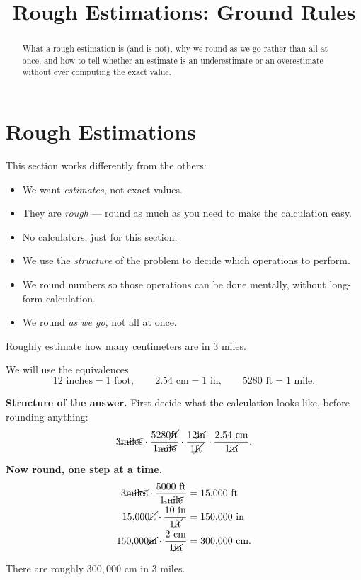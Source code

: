 \documentclass[12pt]{ximera}
\title{Rough Estimations: Ground Rules}
\begin{document}
\begin{abstract}
What a rough estimation is (and is not), why we round as we go rather than all at
once, and how to tell whether an estimate is an underestimate or an overestimate
without ever computing the exact value.
\end{abstract}
\maketitle

\section*{Rough Estimations}

This section works differently from the others:

\begin{itemize}
  \item We want \emph{estimates}, not exact values.
  \item They are \emph{rough} --- round as much as you need to make the calculation easy.
  \item No calculators, just for this section.
  \item We use the \emph{structure} of the problem to decide which operations to perform.
  \item We round numbers so those operations can be done mentally, without long-form
    calculation.
  \item We round \emph{as we go}, not all at once.
\end{itemize}

\begin{example}
Roughly estimate how many centimeters are in $3$ miles.

We will use the equivalences
\[
12 \text{ inches} = 1 \text{ foot}, \qquad
2.54 \text{ cm} = 1 \text{ in}, \qquad
5280 \text{ ft} = 1 \text{ mile}.
\]

\textbf{Structure of the answer.} First decide what the calculation looks like, before
rounding anything:
\[
3 \cancel{\text{miles}} \cdot \frac{5280 \cancel{\text{ft}}}{1 \cancel{\text{mile}}}
\cdot \frac{12 \cancel{\text{in}}}{1 \cancel{\text{ft}}}
\cdot \frac{2.54 \text{ cm}}{1 \cancel{\text{in}}}.
\]

\textbf{Now round, one step at a time.}
\[
\begin{aligned}
3 \cancel{\text{miles}} \cdot \frac{5000 \text{ ft}}{1 \cancel{\text{mile}}}
  &= 15{,}000 \text{ ft} \\
15{,}000 \cancel{\text{ft}} \cdot \frac{10 \text{ in}}{1 \cancel{\text{ft}}}
  &= 150{,}000 \text{ in} \\
150{,}000 \cancel{\text{in}} \cdot \frac{2 \text{ cm}}{1 \cancel{\text{in}}}
  &= 300{,}000 \text{ cm}.
\end{aligned}
\]

There are roughly $300{,}000$ cm in $3$ miles.
\end{example}
\end{document}
